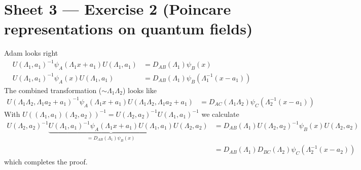 \documentclass[10pt,a4paper]{report}
\theoremstyle{definition}
\begin{document}
\section{Sheet 3 — Exercise 2 (Poincare representations on quantum fields)}
Adam looks right
\begin{align}
U(\Lambda_1,a_1)^{-1}\psi_A(\Lambda_1 x+a_1)U(\Lambda_1,a_1)
&=D_{AB}(\Lambda_1)\psi_B(x)\\
U(\Lambda_1,a_1)^{-1}\psi_A(x)U(\Lambda_1,a_1)
&=D_{AB}(\Lambda_1)\psi_B(\Lambda_1^{-1}(x-a_1))
\end{align}
The combined transformation ($\sim\Lambda_1\Lambda_2$) looks like
\begin{align}
U(\Lambda_1\Lambda_2,\Lambda_1a_2+a_1)^{-1}\psi_A(\Lambda_1 x+a_1)U(\Lambda_1\Lambda_2,\Lambda_1a_2+a_1)&=D_{AC}(\Lambda_1\Lambda_2)\psi_C(\Lambda_2^{-1}(x-a_1))
\end{align}
With $U((\Lambda_1,a_1)(\Lambda_2,a_2))^{-1}=U(\Lambda_2,a_2)^{-1}U(\Lambda_1,a_1)^{-1}$ we calculate
\begin{align}
U(\Lambda_2,a_2)^{-1}\underbrace{U(\Lambda_1,a_1)^{-1}\psi_A(\Lambda_1 x+a_1)U(\Lambda_1,a_1)}_{=D_{AB}(\Lambda_1)\psi_B(x)}U(\Lambda_2,a_2)
&=D_{AB}(\Lambda_1)U(\Lambda_2,a_2)^{-1}\psi_B(x)U(\Lambda_2,a_2)\\
&=D_{AB}(\Lambda_1)D_{BC}(\Lambda_2)\psi_C(\Lambda_2^{-1}(x-a_2))
\end{align}
which completes the proof.
\end{document}
